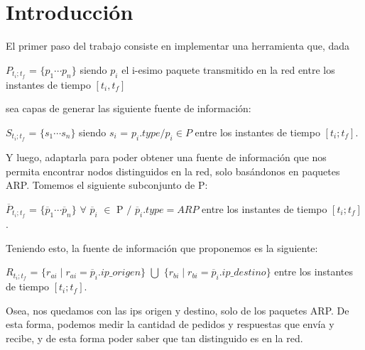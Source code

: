 \section{Introducci\'on}

El primer paso del trabajo consiste en implementar una herramienta que, dada 

\begin{center}
	$P_{t_i;t_f}$ = $\{p_1 \dotsb p_n\}$ siendo $p_i$ el i-esimo paquete transmitido en la red entre los instantes de tiempo $[t_i, t_f]$
\end{center}

sea capas de generar las siguiente fuente de información:

\begin{center}
	$S_{t_i;t_f}$ = $\{s_1 \dotsb s_n\}$ siendo $s_i$ = $p_i.type / p_i \in P$ entre los instantes de tiempo $[t_i; t_f ]$.
\end{center}

Y luego, adaptarla para poder obtener una fuente de información que nos permita encontrar nodos distinguidos en la red, solo basándonos en paquetes ARP.
Tomemos el siguiente subconjunto de P: 

\begin{center}
	$\overline{P}_{t_i;t_f}$ = $\{\overline{p}_1 \dotsb \overline{p}_n\}$ $\forall$ $\overline{p}_i$ $\in$ P $/$ $\overline{p}_i.type = ARP$ entre los instantes de tiempo $[t_i; t_f ]$.
\end{center}

Teniendo esto, la fuente de información que proponemos es la siguiente:

\begin{center}
	$R_{t_i;t_f}$ = $\{r_{ai} \mid r_{ai} = \overline{p}_i.ip\_origen \}$ $\bigcup$ $\{r_{bi} \mid r_{bi} = \overline{p}_i.ip\_destino \}$ entre los instantes de tiempo $[t_i; t_f ]$.
\end{center}

Osea, nos quedamos con las ips origen y destino, solo de los paquetes ARP. De esta forma, podemos medir la cantidad de pedidos y respuestas que envía y recibe, y de esta forma poder saber que tan distinguido es en la red.

